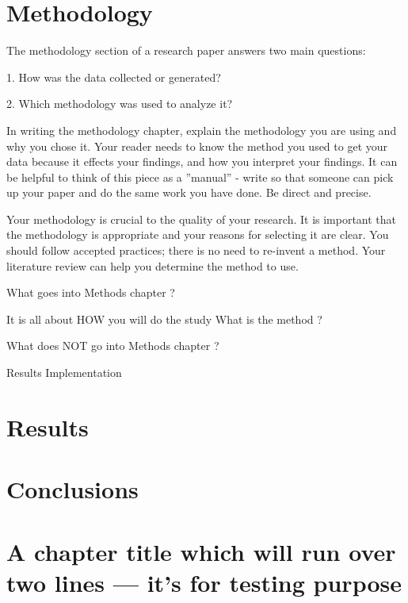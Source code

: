\documentclass[mscthesis]{usiinfthesis}
\begin{document}
\chapter{Methodology}\label{chap:methodology}
The methodology section of a research paper answers two main questions:

1. How was the data collected or generated?

2. Which methodology was used to analyze it?

In writing the methodology chapter, explain the methodology you are using and why you chose it. Your reader needs to know the method you used to get your data because it effects your findings, and how you interpret your findings. It can be helpful to think of this piece as a ''manual'' - write so that someone can pick up your paper and do the same work you have done. Be direct and precise.

Your methodology is crucial to the quality of your research. It is important that the methodology is appropriate and your reasons for selecting it are clear. You should follow accepted practices; there is no need to re-invent a method. Your literature review can help you determine the method to use.

What  goes  into  Methods  chapter  ?  

It  is  all  about  HOW  you  will  do  the  study   What  is  the  method  ?  

What  does NOT go  into  Methods  chapter  ?  

Results  Implementation










\chapter{Results}\label{chap:results}


\chapter{Conclusions}\label{chap:conclusions}


\chapter[Short title]{A chapter title which will run over two lines --- it's for
  testing purpose}
\end{document}
